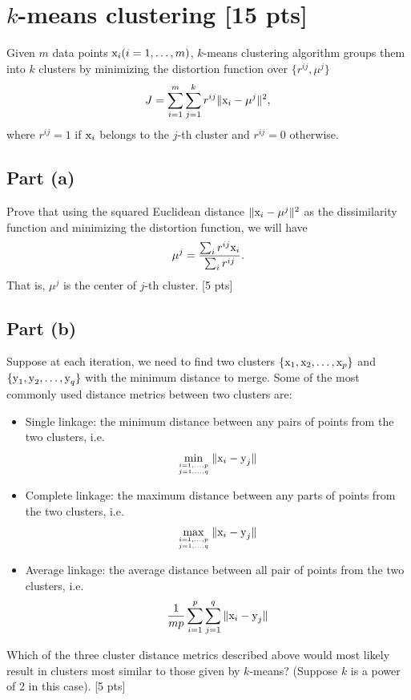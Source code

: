 \documentclass[12pt]{article}
\begin{document}
\section{$k$-means clustering [15 pts]}

Given $m$ data points $\text x_i (i=1,\dots,m)$, $k$-means clustering algorithm groups them into $k$ clusters by minimizing the distortion function over $\{ r^{ij}, \mu^j \}$
$$J=\sum_{i=1}^m\sum_{j=1}^kr^{ij} \|\text x_i-\mu^j\|^2,$$
where $r^{ij}=1$ if $\text x_i$ belongs to the $j$-th cluster and $r^{ij}=0$ otherwise.

\subsection*{ Part (a)}
Prove that using the squared Euclidean distance $\|\text x_i-\mu^j\|^2$ as the dissimilarity function and minimizing the distortion function, we will have 
   $$\mu^j=\frac{\sum_i r^{ij} \text x_i}{\sum_i r^{ij}}.$$
   That is, $\mu^j$ is the center of $j$-th cluster. [5 pts]

\subsection*{ Part (b)}
Suppose at each iteration, we need to find two clusters $\{\text x_1, \text x_2, \dots, \text x_p\}$ and $\{\text y_1, \text y_2, \dots, \text y_q\}$ with the minimum distance to merge. Some of the most commonly used distance metrics between two clusters are:
    \begin{itemize}
    \item Single linkage: the minimum distance between any pairs of points from the two clusters, i.e.
    $$\min_{i=1,\dots,p \atop j=1,\dots, q}\|\text x_i - \text y_j\|$$
    \item Complete linkage: the maximum distance between any parts of points from the two clusters, i.e.
    $$\max_{i=1,\dots,p \atop j=1,\dots, q}\|\text x_i - \text y_j\|$$
    \item Average linkage: the average distance between all pair of points from the two clusters, i.e.
    $$\frac{1}{mp}\sum_{i=1}^p\sum_{j=1}^q\|\text x_i - \text y_j\|$$
    \end{itemize}

Which of the three cluster distance metrics described above would most likely result in clusters most similar to those given by $k$-means? (Suppose $k$ is a power of 2 in this case). [5 pts]
\end{document}
